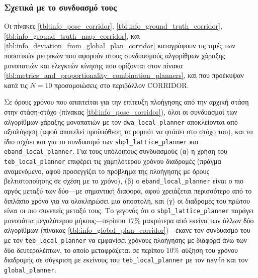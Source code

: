 \subsubsection{Σχετικά με το συνδυασμό τους}

Οι πίνακες \ref{tbl:info_pose_corridor}, \ref{tbl:info_ground_truth_corridor},
\ref{tbl:info_ground_truth_map_corridor}, και
\ref{tbl:info_deviation_from_global_plan_corridor} καταγράφουν τις τιμές των
ποσοτικών μετρικών που αφορούν στους συνδυασμούς αλγορίθμων χάραξης μονοπατιών
και ελεγκτών κίνησης που ορίζονται στον πίνακα
\ref{tbl:metrics_and_proportionality_combination_planners}, και που προέκυψαν
κατά τις $N = 10$ προσομοιώσεις στο περιβάλλον CORRIDOR.

Σε όρους χρόνου που απαιτείται για την επίτευξη πλοήγησης από την αρχική στάση
στην στάση-στόχο (πίνακας \ref{tbl:info_pose_corridor}), όλοι οι συνδυασμοί των
αλγορίθμων χάραξης μονοπατιών με τον \texttt{dwa\_local\_planner} αποκλείονται
από αξιολόγηση (αφού αποτελεί προϋπόθεση το ρομπότ να φτάσει στο στόχο του),
και το ίδιο ισχύει και για το συνδυασμό των \texttt{sbpl\_lattice\_planner} και
\texttt{eband\_local\_planner}. Για τους υπόλοιπους συνδυασμούς (α) η χρήση του
\texttt{teb\_local\_planner} επιφέρει τις χαμηλότερου χρόνου διαδρομές (πράγμα
αναμενόμενο, αφού προσεγγίζει το πρόβλημα της πλοήγησης με όρους
βελτιστοποίησης σε σχέση με το χρόνο), (β) ο \texttt{eband\_local\_planner}
είναι ο πιο αργός μεταξύ των δύο---με σημαντική διαφορά, αφού χρειάζεται
περισσότερο από το διπλάσιο χρόνο για να ολοκληρώσει μια αποστολή, και (γ)
οι διαδρομές του πρώτου είναι οι πιο συνεπείς μεταξύ τους. Το γεγονός ότι ο
\texttt{sbpl\_lattice\_planner} παράγει μονοπάτια μεγαλύτερου μήκους---περίπου
$17\%$ μακρύτερα από εκείνα των άλλων δύο αλγορίθμων (πίνακας
\ref{tbl:info_global_plan_corridor})---έκανε τον συνδυασμό του με τον
\texttt{teb\_local\_planner} να εμφανίσει χρόνους πλοήγησης με διαφορά άνω των
δύο δευτερολέπτων, το οποίο μεταφράζεται σε περίπου $10\%$ αύξηση του χρόνου
διαδρομής σε σύγκριση με εκείνους του \texttt{teb\_local\_planner} με τον
\texttt{navfn} και τον \texttt{global\_planner}.

